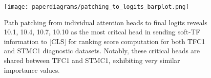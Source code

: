 \begin{figure}[!ht]
    \centering
    \texttt{[image: paperdiagrams/patching\_to\_logits\_barplot.png]}
    \caption{Path patching from individual attention heads to final logits reveals 10.1, 10.4, 10.7, 10.10 as the most critcal head in sending soft-TF information to [CLS] for ranking score computation for both TFC1 and STMC1 diagnostic datasets. Notably, these critical heads are shared between TFC1 and STMC1, exhibiting very similar importance values.} 
    \label{fig:BMHeads_patching}
\end{figure}